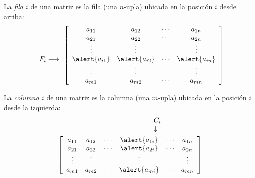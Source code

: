 \documentclass[handout]{beamer} %
\renewcommand{\_}[1]{_{\left[ #1 \right]}}
\renewcommand{\^}[1]{^{\left[ #1 \right]}}
\begin{document}
\begin{frame}
	
La \textit{fila $i$ } de una matriz es la fila (una $n$-upla) ubicada en la posición $i$ desde arriba:	
	\begin{equation*}
	\begin{array}{r}
	   \\ 
  \\ 
  \\ 
F_i \longrightarrow  \\  
    \\ 
  \\ 
	\end{array}
	\left[
	\begin{array}{cccc}
	a_{11} & a_{12} & \cdots & a_{1n}\\ 
	a_{21} & a_{22} & \cdots & a_{2n}\\
	\vdots & \vdots & & \vdots\\
	\alert{a_{i1}} & \alert{a_{i2}} & \cdots &  \alert{a_{in}}\\  
	\vdots & \vdots & & \vdots\\
	a_{m1} & a_{m2} & \cdots & a_{mn}
	\end{array}
	\right] 
	\end{equation*}
	
\end{frame}


\begin{frame}
	
	La \textit{columna $i$ } de una matriz es la columna (una $m$-upla) ubicada en la posición $i$ desde la izquierda:	
	\begin{align*}
	\begin{array}{l}
	C_i \qquad\qquad\quad\,\,\\ \downarrow  
	\end{array}
\\
	\left[
	\begin{array}{cccccc}
	a_{11} & a_{12} & \cdots & \alert{a_{1i}}& \cdots& a_{1n}\\ 
	a_{21} & a_{22} & \cdots & \alert{a_{2i}}& \cdots& a_{2n}\\ 
	\vdots & \vdots &   & \vdots&  & \vdots\\ 
	a_{m1} & a_{m2} & \cdots & \alert{a_{mi}}& \cdots& a_{mn}
	\end{array}
	\right] 
	\end{align*}
	
\end{frame}
\end{document}
